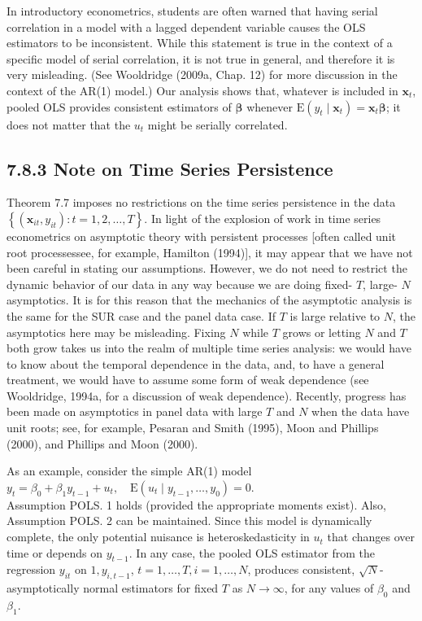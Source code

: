 \documentclass[10pt]{article}
\begin{document}
In introductory econometrics, students are often warned that having serial correlation in a model with a lagged dependent variable causes the OLS estimators to be inconsistent. While this statement is true in the context of a specific model of serial correlation, it is not true in general, and therefore it is very misleading. (See Wooldridge (2009a, Chap. 12) for more discussion in the context of the AR(1) model.) Our analysis shows that, whatever is included in $\mathbf{x}_{t}$, pooled OLS provides consistent estimators of $\boldsymbol{\beta}$ whenever $\mathrm{E}\left(y_{t} \mid \mathbf{x}_{t}\right)=\mathbf{x}_{t} \boldsymbol{\beta}$; it does not matter that the $u_{t}$ might be serially correlated.

\subsection*{7.8.3 Note on Time Series Persistence}
Theorem 7.7 imposes no restrictions on the time series persistence in the data $\left\{\left(\mathbf{x}_{i t}, y_{i t}\right): t=1,2, \ldots, T\right\}$. In light of the explosion of work in time series econometrics on asymptotic theory with persistent processes [often called unit root processessee, for example, Hamilton (1994)], it may appear that we have not been careful in stating our assumptions. However, we do not need to restrict the dynamic behavior of our data in any way because we are doing fixed- $T$, large- $N$ asymptotics. It is for this reason that the mechanics of the asymptotic analysis is the same for the SUR case and the panel data case. If $T$ is large relative to $N$, the asymptotics here may be misleading. Fixing $N$ while $T$ grows or letting $N$ and $T$ both grow takes us into the realm of multiple time series analysis: we would have to know about the temporal dependence in the data, and, to have a general treatment, we would have to assume some form of weak dependence (see Wooldridge, 1994a, for a discussion of weak dependence). Recently, progress has been made on asymptotics in panel data with large $T$ and $N$ when the data have unit roots; see, for example, Pesaran and Smith (1995), Moon and Phillips (2000), and Phillips and Moon (2000).

As an example, consider the simple AR(1) model\\
$y_{t}=\beta_{0}+\beta_{1} y_{t-1}+u_{t}, \quad \mathrm{E}\left(u_{t} \mid y_{t-1}, \ldots, y_{0}\right)=0$.\\
Assumption POLS. 1 holds (provided the appropriate moments exist). Also, Assumption POLS. 2 can be maintained. Since this model is dynamically complete, the only potential nuisance is heteroskedasticity in $u_{t}$ that changes over time or depends on $y_{t-1}$. In any case, the pooled OLS estimator from the regression $y_{i t}$ on $1, y_{i, t-1}$, $t=1, \ldots, T, i=1, \ldots, N$, produces consistent, $\sqrt{N}$-asymptotically normal estimators for fixed $T$ as $N \rightarrow \infty$, for any values of $\beta_{0}$ and $\beta_{1}$.
\end{document}
